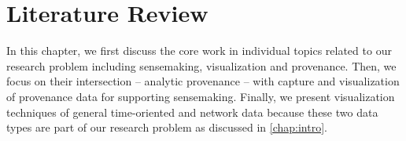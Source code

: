\chapter{Literature Review}
\label{chap:review}

\graphicspath{{Chapter2/figures/}}

In this chapter, we first discuss the core work in individual topics related to our research problem including sensemaking, visualization and provenance. Then, we focus on their intersection -- analytic provenance -- with capture and visualization of provenance data for supporting sensemaking. Finally, we present visualization techniques of general time-oriented and network data because these two data types are part of our research problem as discussed in \autoref{chap:intro}.

% 



%
%
